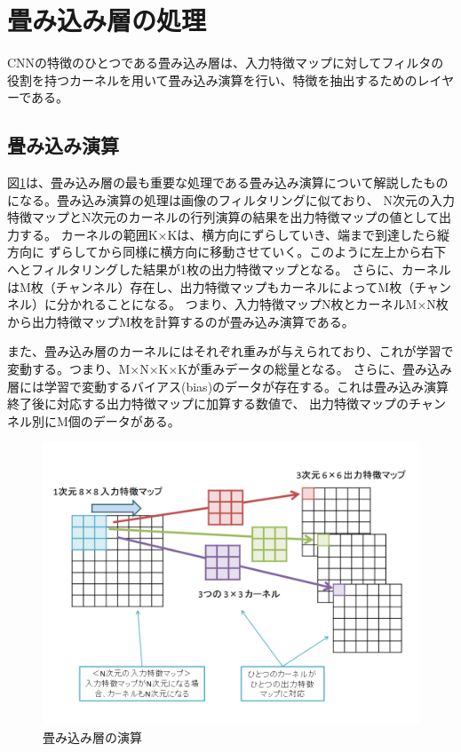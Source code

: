 \section{畳み込み層の処理}
CNNの特徴のひとつである畳み込み層は、入力特徴マップに対してフィルタの役割を持つカーネルを用いて畳み込み演算を行い、特徴を抽出するためのレイヤーである。

\subsection{畳み込み演算}
図\ref{fig_conv}は、畳み込み層の最も重要な処理である畳み込み演算について解説したものになる。畳み込み演算の処理は画像のフィルタリングに似ており、
N次元の入力特徴マップとN次元のカーネルの行列演算の結果を出力特徴マップの値として出力する。
カーネルの範囲K×Kは、横方向にずらしていき、端まで到達したら縦方向に
ずらしてから同様に横方向に移動させていく。このように左上から右下へとフィルタリングした結果が1枚の出力特徴マップとなる。
さらに、カーネルはM枚（チャンネル）存在し、出力特徴マップもカーネルによってM枚（チャンネル）に分かれることになる。
つまり、入力特徴マップN枚とカーネルM×N枚から出力特徴マップM枚を計算するのが畳み込み演算である。

また、畳み込み層のカーネルにはそれぞれ重みが与えられており、これが学習で変動する。つまり、M×N×K×Kが重みデータの総量となる。
さらに、畳み込み層には学習で変動するバイアス(bias)のデータが存在する。これは畳み込み演算終了後に対応する出力特徴マップに加算する数値で、
出力特徴マップのチャンネル別にM個のデータがある。


\begin{figure}[ht]  
 \begin{center}   
	\includegraphics[width=1.0\columnwidth,bb=0 0 720 540]{img/conv.png}
    \caption{畳み込み層の演算}
  \label{fig_conv}  
 \end{center}  
\end{figure}

